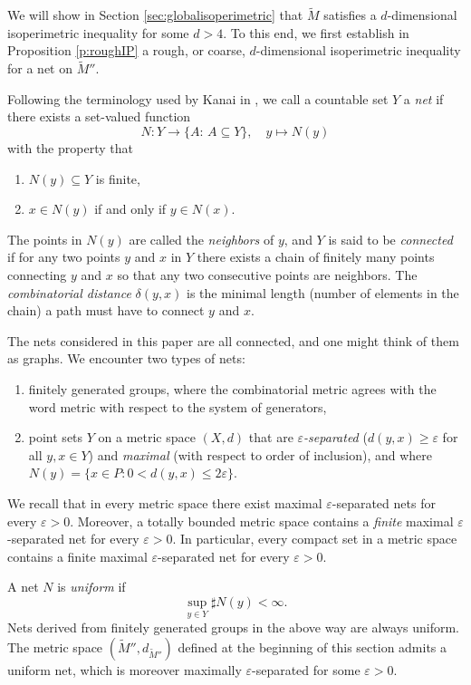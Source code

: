 \documentclass[10pt,letterpaper]{amsart}
\theoremstyle{definition}
\numberwithin{thm}{subsection}
\numberwithin{equation}{section}
\begin{document}
We will show in Section \ref{sec:globalisoperimetric} that $\widetilde{M}$ satisfies a $d$-dimensional isoperimetric inequality for some $d>4$. To this end, we first establish in Proposition \ref{p:roughIP} a rough, or coarse,  $d$-dimensional isoperimetric inequality  for a net on $\widetilde{M}''$.

Following the terminology used by Kanai in \cite{MR792983}, we call a countable set $Y$ a \emph{net} if there exists a set-valued function
\begin{displaymath}
N: Y \to \{A:\, A \subseteq Y\},\quad y\mapsto N(y)
\end{displaymath}
with the property that
\begin{enumerate}
\item $N(y) \subseteq Y$ is finite,
\item $x\in N(y)$ if and only if $y\in N(x)$.
\end{enumerate}
The points in $N(y)$ are called the \emph{neighbors} of $y$, and $Y$ is said to be \emph{connected} if for any two points $y$ and $x$ in $Y$ there exists a chain of finitely many points connecting $y$ and $x$ so that any two consecutive points are neighbors. The \emph{combinatorial distance} $\delta(y,x)$ is the minimal length (number of elements in the chain) a path must have to connect $y$ and $x$.

The nets considered in this paper are all connected, and one might think of them as {graphs}. We encounter two types of nets:
\begin{enumerate}
\item finitely generated groups, where the combinatorial metric agrees with the word metric with respect to the system of generators,
\item point sets $Y$ on a metric space $(X,d)$ that are \emph{$\varepsilon$-separated} ($d(y,x)\geq \varepsilon$ for all $y,x\in Y$) and \emph{maximal} (with respect to order of inclusion), and where $N(y)=\{x\in P: 0<d(y,x)\leq 2\varepsilon\}$.
\end{enumerate}

We recall that in every metric space there exist maximal $\varepsilon$-separated nets for every $\varepsilon>0$. Moreover, a totally bounded metric space contains a \emph{finite} maximal $\varepsilon$-separated net for every $\varepsilon>0$. In particular, every compact set in a metric space contains a finite maximal $\varepsilon$-separated net for every $\varepsilon>0$.

A net $N$ is \emph{uniform} if
\begin{displaymath}
\sup_{y\in Y} \sharp N(y) <\infty.
\end{displaymath}
Nets derived from finitely generated groups in the above way are always uniform. The metric space $(\widetilde{M}'',d_{\widetilde{M}''})$ defined at the beginning of this section admits a uniform net, which is moreover maximally $\varepsilon$-separated for some $\varepsilon>0$.
\end{document}
